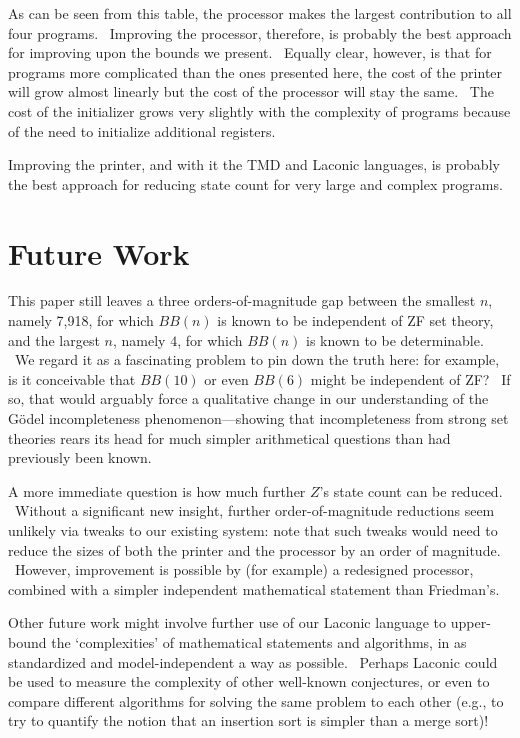 \documentclass[11pt]{article}
\newcommand{\statenumcomma}{7,918, }
\begin{document}
As can be seen from this table, the processor makes the largest contribution to all four programs. \ Improving the processor, therefore, is probably the best approach for improving upon the bounds we present. \ Equally clear, however, is that for programs more complicated than the ones presented here, the cost of the printer will grow almost linearly but the cost of the processor will stay the same. \ The cost of the initializer grows very slightly with the complexity of programs because of the need to initialize additional registers.

Improving the printer, and with it the TMD and Laconic languages, is probably the best approach for reducing state count for very large and complex programs.

\section{Future Work}

This paper still leaves a three orders-of-magnitude gap between the smallest $n$, namely \statenumcomma for which $BB(n)$ is known to be independent of ZF set theory, and the largest $n$, namely $4$, for which $BB(n)$ is known to be determinable. \ We regard it as a fascinating problem to pin down the truth here: for example, is it conceivable that $BB(10)$ or even $BB(6)$ might be independent of ZF? \ If so, that would arguably force a qualitative change in our understanding of the G\"{o}del incompleteness phenomenon---showing that incompleteness from strong set theories rears its head for much simpler arithmetical questions than had previously been known.

A more immediate question is how much further $Z$'s state count can be reduced. \ Without a significant new insight, further order-of-magnitude reductions seem unlikely via tweaks to our existing system: note that such tweaks would need to reduce the sizes of both the printer and the processor by an order of magnitude. \ However, improvement is possible by (for example) a redesigned processor, combined with a simpler independent mathematical statement than Friedman's.

Other future work might involve further use of our Laconic language to upper-bound the `complexities' of mathematical statements and algorithms, in as standardized and model-independent a way as possible. \ Perhaps Laconic could be used to measure the complexity of other well-known conjectures, or even to compare different algorithms for solving the same problem to each other (e.g., to try to quantify the notion that an insertion sort is simpler than a merge sort)!
\end{document}
